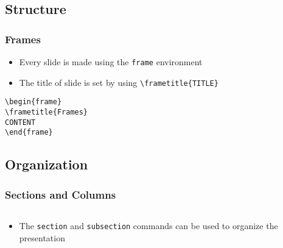 \documentclass[10pt]{beamer}
\begin{document}
\subsection{Structure}
\begin{frame}[fragile]
\frametitle{Frames}

\begin{itemize}
\item Every slide is made using the \texttt{frame} environment
\pause\item The title of slide is set by using \verb|\frametitle{TITLE}|
\end{itemize}

\pause\begin{example}
\verb|\begin{frame}|\\
\verb|\frametitle{Frames}|\\
\verb|CONTENT|\\
\verb|\end{frame}|
\end{example}
\end{frame}

\subsection{Organization}
\begin{frame}
\frametitle{Sections and Columns}

\begin{columns}
\begin{column}{.5\textwidth}
\begin{itemize}
\item The \texttt{section} and \texttt{subsection} commands can be used to organize the presentation
\end{itemize}
\end{column}

\begin{column}{.5\textwidth}
\begin{itemize}
\end{itemize} 
\end{column}
\end{columns}

\end{frame}
\end{document}
